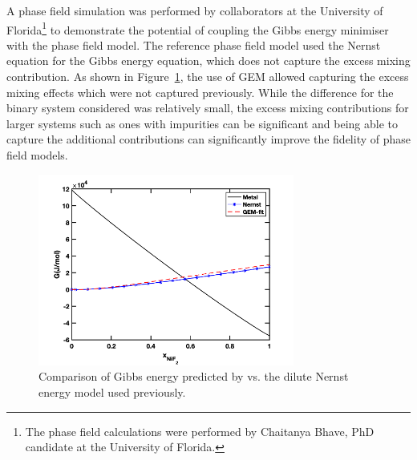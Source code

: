 A phase field simulation was performed by collaborators at the University of Florida\footnote{The phase field calculations were performed by Chaitanya Bhave, PhD candidate at the University of Florida.} to demonstrate the potential of coupling the Gibbs energy minimiser with the phase field model. The reference phase field model used the Nernst equation for the Gibbs energy equation, which does not capture the excess mixing contribution. As shown in Figure~\ref{fig:pfgibbs}, the use of GEM allowed capturing the excess mixing effects which were not captured previously. While the difference for the binary system considered was relatively small, the excess mixing contributions for larger systems such as ones with impurities can be significant and being able to capture the additional contributions can significantly improve the fidelity of phase field models.
    \begin{figure}[h!]
        \centering
        \includegraphics[width=0.75\textwidth]{figures/chapter-7/gibbs.png}
        \caption{Comparison of Gibbs energy predicted by {\GEM} vs. the dilute Nernst energy model used previously.}
        \label{fig:pfgibbs}
    \end{figure}

